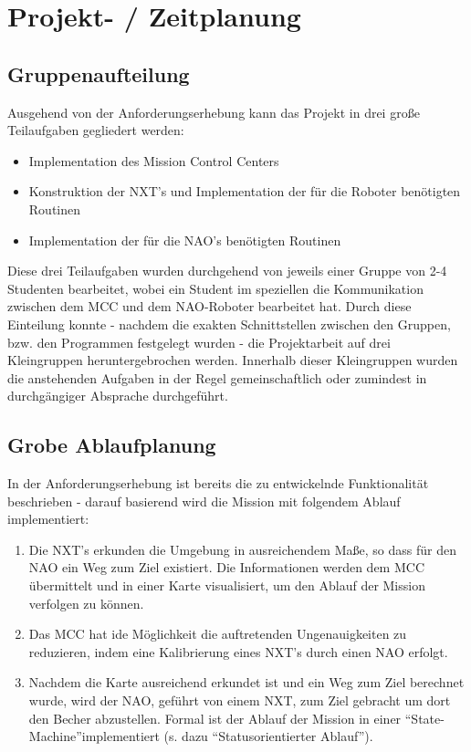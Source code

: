 \chapter{Projekt- / Zeitplanung}\label{prjzeitplanung}


\section{Gruppenaufteilung}

Ausgehend von der Anforderungserhebung kann das Projekt in drei große Teilaufgaben gegliedert werden:
\begin{itemize}
\item Implementation des Mission Control Centers
\item Konstruktion der NXT's und Implementation der für die Roboter benötigten Routinen
\item Implementation der für die NAO's benötigten Routinen
\end{itemize}
Diese drei Teilaufgaben wurden durchgehend von jeweils einer Gruppe von 2-4 Studenten bearbeitet, wobei ein Student im speziellen die Kommunikation zwischen dem MCC und dem NAO-Roboter bearbeitet hat.
Durch diese Einteilung konnte - nachdem die exakten Schnittstellen zwischen den Gruppen, bzw. den Programmen festgelegt wurden - die Projektarbeit auf drei Kleingruppen heruntergebrochen werden. Innerhalb dieser Kleingruppen wurden die anstehenden Aufgaben in der Regel gemeinschaftlich oder zumindest in durchgängiger Absprache durchgeführt.


\section{Grobe Ablaufplanung}

In der Anforderungserhebung ist bereits die zu entwickelnde Funktionalität beschrieben - darauf basierend wird die Mission mit folgendem Ablauf implementiert:
\begin{enumerate}
\item Die NXT's erkunden die Umgebung in ausreichendem Maße, so dass für den NAO ein Weg zum Ziel existiert. Die Informationen werden dem MCC übermittelt und in einer Karte visualisiert, um den Ablauf der Mission verfolgen zu können.
\item Das MCC hat ide Möglichkeit die auftretenden Ungenauigkeiten zu reduzieren, indem eine Kalibrierung eines NXT's durch einen NAO erfolgt.
\item Nachdem die Karte ausreichend erkundet ist und ein Weg zum Ziel berechnet wurde, wird der NAO, geführt von einem NXT, zum Ziel gebracht um dort den Becher abzustellen.
Formal ist der Ablauf der Mission in einer ``State-Machine''implementiert (s. dazu ``Statusorientierter Ablauf''). 
\end{enumerate}